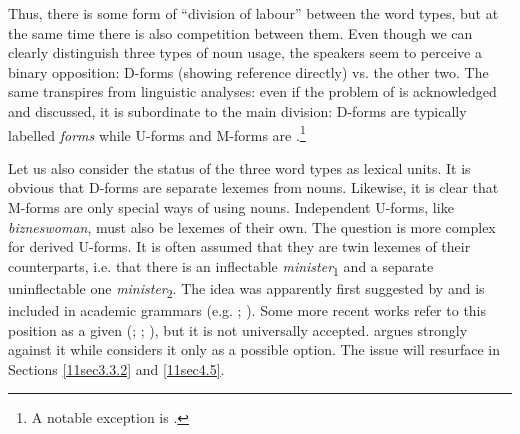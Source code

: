 \documentclass[output=paper,colorlinks,citecolor=brown]{langscibook}
\begin{document}
Thus, there is some form of ``division of labour'' between the word types, but at the same time there is also competition between them. Even though we can clearly distinguish three types of noun usage, the speakers seem to perceive a binary opposition: D-forms (showing  reference directly) vs. the other two. The same transpires from linguistic analyses: even if the problem of  is acknowledged and discussed, it is subordinate to the main division: D-forms are typically labelled \textit{ forms} while U-forms and M-forms are \textit{}.\footnote{A notable exception is \citet[21, 172ff.]{krzyzanowski2013}.}

Let us also consider the status of the three word types as lexical units. It is obvious that D-forms are separate lexemes from  nouns. Likewise, it is clear that M-forms are only special ways of using  nouns. Independent U-forms, like \emph{bizneswoman}, must also be lexemes of their own. The question is more complex for derived U-forms. It is often assumed that they are twin lexemes of their  counterparts, i.e. that there is an inflectable   \emph{minister}\textsubscript{1} and a separate uninflectable  one \emph{minister}\textsubscript{2}. The idea was apparently first suggested by \citet[68]{kucala1978} and is included in academic grammars (e.g. \citealt[368]{grzegorczykowapuzynina1998-problemy}; \citealt[422]{grzegorczykowa1998-rzeczownik}). Some more recent works refer to this position as a given (\citealt[126]{jadacka2006}; \citealt{rjp2012}; \citealt[626]{andrejewicz2019}), but it is
not universally accepted. \citet[227]{lazinski2006} argues strongly against it while \citet[229]{bobrowski2012} considers it only as a possible option. The issue will resurface in Sections \ref{11sec3.3.2} and \ref{11sec4.5}.
\end{document}
